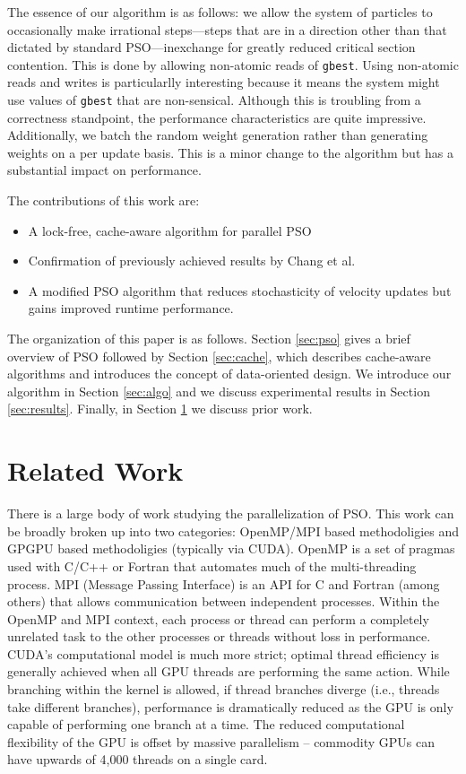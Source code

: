 The essence of our algorithm is as follows: we allow the system of particles to occasionally
make irrational steps---steps that are in a direction other than that dictated by
standard PSO---inexchange for greatly reduced critical section contention.
This is done by 
allowing non-atomic reads of \texttt{gbest}. Using non-atomic reads and writes
is particularlly interesting because it means the system might use values of
\texttt{gbest} that are non-sensical. Although this is troubling from a
correctness standpoint, the performance characteristics are quite
impressive. Additionally, we batch the random weight generation rather than
generating weights on a per update basis. This is a minor change to the
algorithm but has a substantial impact on performance.

The contributions of this work are:
\begin{itemize}
\item A lock-free, cache-aware algorithm for parallel PSO
\item Confirmation of previously achieved results by Chang et
  al. \cite{cache-pso}
\item A modified PSO algorithm that reduces stochasticity of velocity updates
  but gains improved runtime performance.  
\end{itemize}

The organization of this paper is as follows. Section \ref{sec:pso} gives a
brief overview of PSO followed by Section \ref{sec:cache}, which describes
cache-aware algorithms and introduces the concept of data-oriented design. We
introduce our algorithm in Section \ref{sec:algo} and we discuss experimental
results in Section \ref{sec:results}. Finally, in Section
\ref{sec:prior} we discuss prior work.


\section{Related Work}\label{sec:prior}
There is a large body of work studying the parallelization of PSO. This work can
be broadly broken up into two categories: OpenMP/MPI based methodoligies and
GPGPU based methodoligies (typically via CUDA). OpenMP is a set of pragmas used
with C/C++ or Fortran that automates much of the multi-threading process. MPI
(Message Passing Interface) is an API for C and Fortran (among others) that
allows communication between independent processes. Within the OpenMP and MPI
context, each process or thread can perform a completely unrelated task to the
other processes or threads without loss in performance. CUDA's computational
model is much more strict; optimal thread efficiency is generally achieved when
all GPU threads are performing the same action. While branching within the
kernel is allowed, if thread branches diverge (i.e., threads take different
branches), performance is dramatically reduced as the GPU is only capable of
performing one branch at a time. The reduced computational flexibility of the
GPU is offset by massive parallelism -- commodity GPUs can have upwards of 4,000
threads on a single card.

